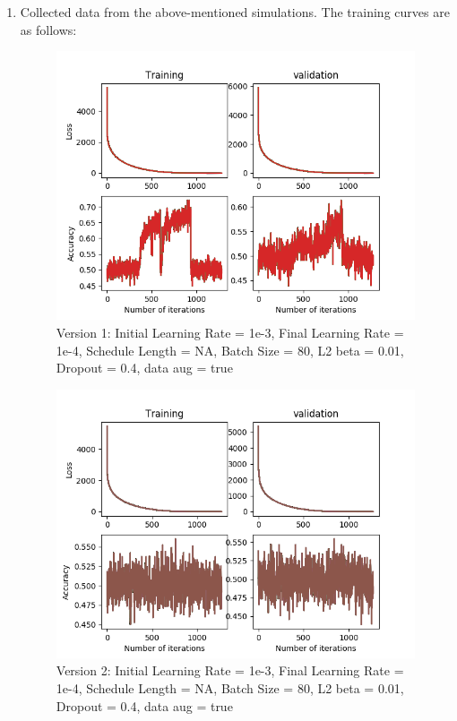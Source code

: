 \documentclass[12pt,reqno]{amsart}
\numberwithin{equation}{section}
\begin{document}
\begin{enumerate}
\item Collected data from the above-mentioned simulations.  The training curves are as follows:

\begin{figure}[H]
\centering
\includegraphics[scale=0.6]{data12_version1_step0}
\caption{Version 1: Initial Learning Rate = 1e-3, Final Learning Rate = 1e-4, Schedule Length = NA, Batch Size = 80, L2 beta = 0.01, Dropout = 0.4, data aug = true}
\end{figure}

\begin{figure}[H]
\centering
\includegraphics[scale=0.6]{data12_version2_step0}
\caption{Version 2: Initial Learning Rate = 1e-3, Final Learning Rate = 1e-4, Schedule Length = NA, Batch Size = 80, L2 beta = 0.01, Dropout = 0.4, data aug = true}
\end{figure}


\end{enumerate}
\end{document}

